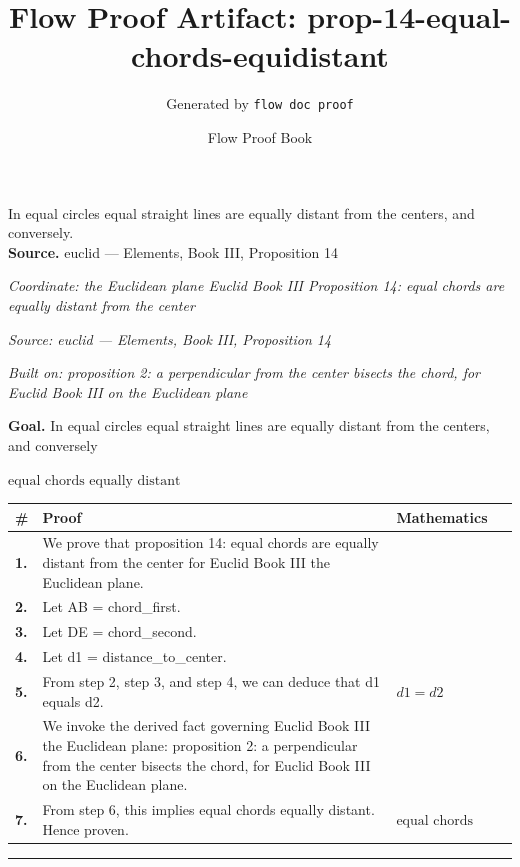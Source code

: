 \documentclass[11pt]{article}
\title{Flow Proof Artifact: prop-14-equal-chords-equidistant}
\author{Generated by \texttt{flow doc proof}}
\date{Flow Proof Book}
\theoremstyle{definition}
\begin{document}
\maketitle
In equal circles equal straight lines are equally distant from the centers, and conversely.\\[0.5em]
\textbf{Source.} euclid — Elements, Book III, Proposition 14\\[0.5em]
\bigskip
{}\par
\smallskip\noindent\textit{Coordinate: the Euclidean plane \cdot Euclid Book III \cdot Proposition 14: equal chords are equally distant from the center}\par
\smallskip\noindent\textit{Source: euclid — Elements, Book III, Proposition 14}\par
\smallskip\noindent\textit{Built on: proposition 2: a perpendicular from the center bisects the chord, for Euclid Book III on the Euclidean plane}\par
\medskip
\noindent\textbf{Goal.} In equal circles equal straight lines are equally distant from the centers, and conversely\par
\noindent$\displaystyle \text{equal chords equally distant}$\par
\medskip
\noindent
\begin{tabular}{@{} >{\raggedright\arraybackslash}p{} >{\raggedright\arraybackslash}p{} >{\raggedleft\arraybackslash}p{} @{}}
\textbf{\#} & \textbf{Proof} & \textbf{Mathematics} \\
\midrule
\textbf{1.} & We prove that proposition 14: equal chords are equally distant from the center for Euclid Book III the Euclidean plane. & \\[0.45em]
\textbf{2.} & Let AB = chord\_first. & \\[0.45em]
\textbf{3.} & Let DE = chord\_second. & \\[0.45em]
\textbf{4.} & Let d1 = distance\_to\_center. & \\[0.45em]
\textbf{5.} & From step 2, step 3, and step 4, we can deduce that d1 equals d2. & $\displaystyle d1 = d2$ \\[0.45em]
\textbf{6.} & We invoke the derived fact governing Euclid Book III the Euclidean plane: proposition 2: a perpendicular from the center bisects the chord, for Euclid Book III on the Euclidean plane. & \\[0.45em]
\textbf{7.} & From step 6, this implies equal chords equally distant. Hence proven. & $\displaystyle \text{equal chords equally distant}$ \\[0.45em]
\bottomrule
\end{tabular}
\label{thm:Geometry-Euclid Book III-proposition_14_equal_chords_are_equally_distant_from_the_center}
\par\medskip\hrule
\end{document}
